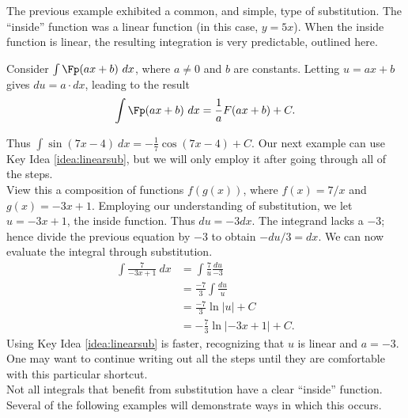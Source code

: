 The previous example exhibited a common, and simple, type of substitution. The ``inside'' function was a linear function (in this case, $y = 5x$). When the inside function is linear, the resulting integration is very predictable, outlined here.

{Consider $\int \Fp(ax+b)\ dx$, where $a\neq 0$ and $b$ are constants. Letting $u = ax+b$ gives $du = a\cdot dx$, leading to the result
$$\int \Fp(ax+b)\ dx = \frac{1}{a}F(ax+b) + C.$$
}

Thus $\int \sin (7x-4)\ dx = -\frac17\cos(7x-4)+C$. Our next example can use Key Idea \ref{idea:linearsub}, but we will only employ it after going through all of the steps.\\

{View this a composition of functions $f(g(x))$, where $f(x) = 7/x$ and $g(x) = -3x+1$. Employing our understanding of substitution, we let $u = -3x+1$, the inside function. Thus $du = -3dx$. The integrand lacks a $-3$; hence divide the previous equation by $-3$ to obtain $-du/3 = dx$. We can now evaluate the integral through substitution.
\begin{align*}
	\int \frac{7}{-3x+1}\ dx &=	\int \frac{7}{u}\frac{du}{-3} \\
												&= \frac{-7}3\int \frac{du}{u} \\
												&=	\frac{-7}3\ln |u| + C\\
												&=-\frac73\ln|-3x+1| + C.
\end{align*}
Using Key Idea \ref{idea:linearsub} is faster, recognizing that $u$ is linear and $a = -3$. One may want to continue writing out all the steps until they are comfortable with this particular shortcut.
}\\

Not all integrals that benefit from substitution have a clear ``inside'' function. Several of the following examples will demonstrate ways in which this occurs.\\

